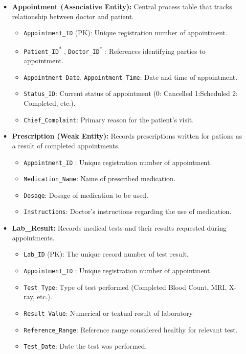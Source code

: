 \documentclass[12pt,a4paper]{article}
\begin{document}
\begin{itemize}[label=\textbf{--}]
	\item \textbf{Appointment (Associative Entity):} Central process table that tracks relationship between doctor and patient.
	      \begin{itemize}[label=$\bullet$]
		      \item \texttt{Appointment\_ID} (PK): Unique registration number of appointment.
		      \item \texttt{Patient\_ID}\textsuperscript{*} , \texttt{Doctor\_ID}\textsuperscript{*} : References identifying parties to appointment.
		      \item \texttt{Appointment\_Date}, \texttt{Appointment\_Time}: Date and time of appointment.
		      \item \texttt{Status\_ID}: Current status of appointment (0: Cancelled 1:Scheduled 2: Completed, etc.).
		      \item \texttt{Chief\_Complaint}: Primary reason for the patient's visit.
	      \end{itemize}

	\item \textbf{Prescription (Weak Entity):} Records prescriptions written for pations as a result of completed appointments.
	      \begin{itemize}[label=$\bullet$]
		      \item \texttt{Appointment\_ID} : Unique registration number of appointment.
		      \item \texttt{Medication\_Name}: Name of prescribed medication.
		      \item \texttt{Dosage}: Dosage of medication to be used.
		      \item \texttt{Instructions}: Doctor's instructions regarding the use of medication.
	      \end{itemize}

	\item \textbf{Lab\_Result:} Records medical tests and their results requested during appointments.
	      \begin{itemize}[label=$\bullet$]
		      \item \texttt{Lab\_ID} (PK): The unique record number of test result.
		      \item \texttt{Appointment\_ID} : Unique registration number of appointment.
		      \item \texttt{Test\_Type}: Type of test performed (Completed Blood Count, MRI, X-ray, etc.).
		      \item \texttt{Result\_Value}: Numerical or textual result of laboratory
		      \item \texttt{Reference\_Range}: Reference range considered healthy for relevant test.
		      \item \texttt{Test\_Date}: Date the test was performed.
	      \end{itemize}


\end{itemize}
\end{document}
